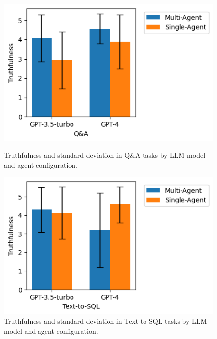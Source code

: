            \begin{figure}[h]
                \centering
                \begin{minipage}{.49\textwidth}
                    \centering                
                    \includegraphics[width=1\linewidth]{images/truthfulness_QA.png}
                    \caption{Truthfulness and standard deviation in Q\&A tasks by LLM model and agent configuration. \\ }
                    \label{fig:truthfulness_QA}
                \end{minipage}%
                \hspace{0.2cm}
                \begin{minipage}{.49\textwidth}
                    \centering
                    \includegraphics[width=1\linewidth]{images/truthfulness_text2sql.png}
                    \caption{Truthfulness and standard deviation in Text-to-SQL tasks by LLM model and agent configuration.}
                    \label{fig:truthfulness_text2sql}
                \end{minipage}
            \end{figure}

